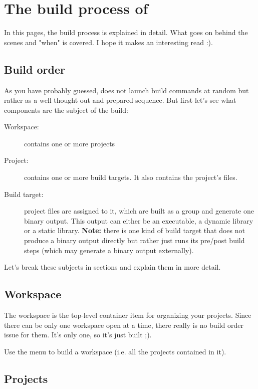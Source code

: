 \section{The build process of \codeblocks}\label{sec:build_process}

In this pages, the build process is explained in detail. What goes on behind the scenes and "when" is covered. I hope it makes an interesting read :).
 
\subsection{Build order}

As you have probably guessed, \codeblocks does not launch build commands at random but rather as a well thought out and prepared sequence. But first let's see what components are the subject of the build:

\begin{description}
\item[Workspace:] contains one or more projects
\item[Project:] contains one or more build targets. It also contains the project's files.
\item[Build target:] project files are assigned to it, which are built as a group and generate one binary output. This output can either be an executable, a dynamic library or a static library. \textbf{Note:} there is one kind of build target that does not produce a binary output directly but rather just runs its pre/post build steps (which may generate a binary output externally).
\end{description}

Let's break these subjects in sections and explain them in more detail.

\subsection{Workspace}

The workspace is the top-level container item for organizing your projects. Since there can be only one workspace open at a time, there really is no build order issue for them. It's only one, so it's just built ;).

Use the menu  to build a workspace (i.e. all the projects contained in it). 

\subsection{Projects}

